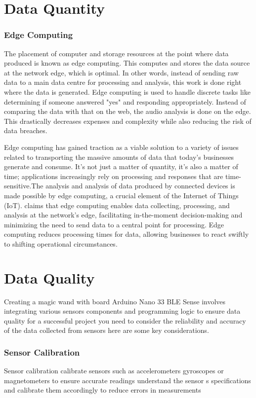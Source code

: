 \section{Data Quantity} 
\subsubsection{Edge Computing}
	The placement of computer and storage resources at the point where data produced is known as edge computing. This computes and stores  the data source at the network edge, which is optimal. In other words, instead of sending raw data to a main data centre for processing and analysis, this work is done right where the data is generated.
	Edge computing is used to handle discrete tasks like determining if someone answered "yes" and responding appropriately. Instead of comparing the data with that on the web, the audio analysis is done on the edge. This drastically decreases expenses and complexity while also reducing the risk of data breaches.\cite{Big:2021}

	Edge computing has gained traction as a viable solution to a variety of issues related to transporting the massive amounts of data that today's businesses generate and consume. It's not just a matter of quantity, it's also a matter of time; applications increasingly rely on processing and responses that are time-sensitive.The analysis and analysis of data produced by connected devices is made possible by edge computing, a crucial element of the Internet of Things (IoT).\cite{Haz:2021} claims that edge computing enables data collecting, processing, and analysis at the network’s edge, facilitating in-the-moment decision-making and minimizing the need to send data to a central point for processing. Edge computing reduces processing times for data, allowing businesses to react swiftly to shifting operational circumstances.

\section{Data Quality}
	Creating a magic wand with board Arduino Nano 33 BLE Sense involves integrating various sensors components and programming logic to ensure data quality for a successful project you need to consider the reliability and accuracy of the data collected from sensors here are some key considerations\cite{Daity:21}.
\subsubsection{Sensor Calibration}
	Sensor calibration calibrate sensors such as accelerometers gyroscopes or magnetometers to ensure accurate readings understand the sensor s specifications and calibrate them accordingly to reduce errors in measurements
